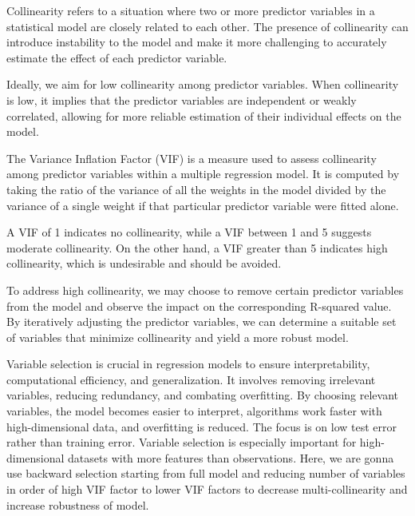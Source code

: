 \documentclass[
]{article}
\begin{document}
Collinearity refers to a situation where two or more predictor variables
in a statistical model are closely related to each other. The presence
of collinearity can introduce instability to the model and make it more
challenging to accurately estimate the effect of each predictor
variable.

Ideally, we aim for low collinearity among predictor variables. When
collinearity is low, it implies that the predictor variables are
independent or weakly correlated, allowing for more reliable estimation
of their individual effects on the model.

The Variance Inflation Factor (VIF) is a measure used to assess
collinearity among predictor variables within a multiple regression
model. It is computed by taking the ratio of the variance of all the
weights in the model divided by the variance of a single weight if that
particular predictor variable were fitted alone.

A VIF of 1 indicates no collinearity, while a VIF between 1 and 5
suggests moderate collinearity. On the other hand, a VIF greater than 5
indicates high collinearity, which is undesirable and should be avoided.

To address high collinearity, we may choose to remove certain predictor
variables from the model and observe the impact on the corresponding
R-squared value. By iteratively adjusting the predictor variables, we
can determine a suitable set of variables that minimize collinearity and
yield a more robust model.

Variable selection is crucial in regression models to ensure
interpretability, computational efficiency, and generalization. It
involves removing irrelevant variables, reducing redundancy, and
combating overfitting. By choosing relevant variables, the model becomes
easier to interpret, algorithms work faster with high-dimensional data,
and overfitting is reduced. The focus is on low test error rather than
training error. Variable selection is especially important for
high-dimensional datasets with more features than observations. Here, we
are gonna use backward selection starting from full model and reducing
number of variables in order of high VIF factor to lower VIF factors to
decrease multi-collinearity and increase robustness of model.
\end{document}
